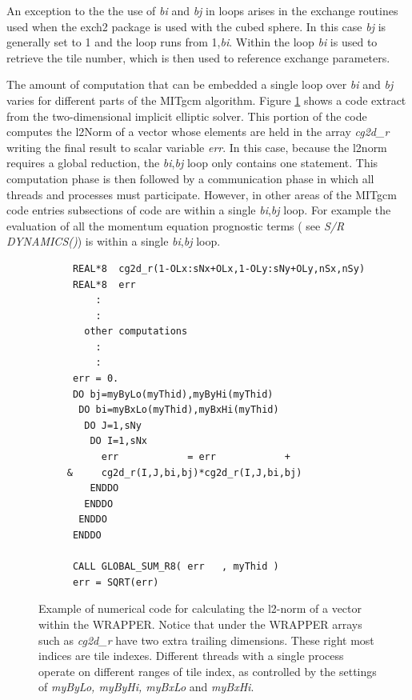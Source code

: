 An exception to the the use of {\em bi} and {\em bj} in loops arises in the
exchange routines used when the exch2 package is used with the cubed 
sphere.  In this case {\em bj} is generally set to 1 and the loop runs from 
1,{\em bi}.  Within the loop {\em bi} is used to retrieve the tile number,
which is then used to reference exchange parameters.

The amount of computation that can be embedded
a single loop over {\em bi} and {\em bj} varies for different parts of the
MITgcm algorithm. Figure \ref{fig:bibj_extract} shows a code extract
from the two-dimensional implicit elliptic solver. This portion of the
code computes the l2Norm of a vector whose elements are held in
the array {\em cg2d\_r} writing the final result to scalar variable
{\em err}. In this case, because the l2norm requires a global reduction,
the {\em bi},{\em bj} loop only contains one statement. This computation
phase is then followed by a communication phase in which all threads and
processes must participate. However,
in other areas of the MITgcm code entries subsections of code are within
a single {\em bi},{\em bj} loop. For example the evaluation of all
the momentum equation prognostic terms ( see {\em S/R DYNAMICS()})
is within a single {\em bi},{\em bj} loop.

\begin{figure}
\begin{verbatim}
      REAL*8  cg2d_r(1-OLx:sNx+OLx,1-OLy:sNy+OLy,nSx,nSy)
      REAL*8  err
          :
          :
        other computations
          :
          :
      err = 0.
      DO bj=myByLo(myThid),myByHi(myThid)
       DO bi=myBxLo(myThid),myBxHi(myThid)
        DO J=1,sNy
         DO I=1,sNx
           err            = err            +
     &     cg2d_r(I,J,bi,bj)*cg2d_r(I,J,bi,bj)
         ENDDO
        ENDDO
       ENDDO
      ENDDO

      CALL GLOBAL_SUM_R8( err   , myThid )
      err = SQRT(err)

\end{verbatim}
\caption{Example of numerical code for calculating
the l2-norm of a vector within the WRAPPER. Notice that
under the WRAPPER arrays such as {\em cg2d\_r} have two extra trailing
dimensions. These right most indices are tile indexes. Different
threads with a single process operate on different ranges of tile
index, as controlled by the settings of
{\em myByLo, myByHi, myBxLo} and {\em myBxHi}.
} \label{fig:bibj_extract}
\end{figure}

